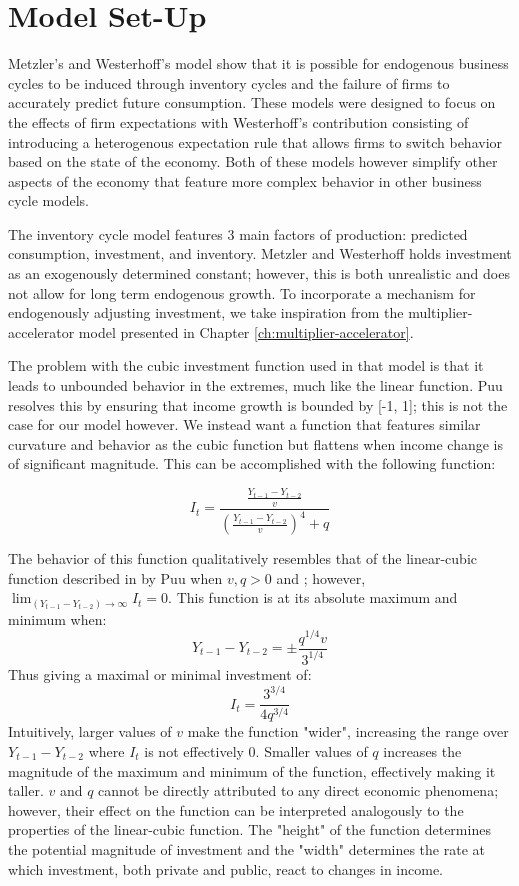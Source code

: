 \section{Model Set-Up}
Metzler's and Westerhoff's model show that it is possible for endogenous business cycles to be induced through inventory cycles and the failure of firms to accurately predict future consumption. These models were designed to focus on the effects of firm expectations with Westerhoff's contribution consisting of introducing a heterogenous expectation rule that allows firms to switch behavior based on the state of the economy. Both of these models however simplify other aspects of the economy that feature more complex behavior in other business cycle models.

The inventory cycle model features 3 main factors of production: predicted consumption, investment, and inventory. Metzler and Westerhoff holds investment as an exogenously determined constant; however, this is both unrealistic and does not allow for long term endogenous growth. To incorporate a mechanism for endogenously adjusting investment, we take inspiration from the multiplier-accelerator model presented in Chapter \ref{ch:multiplier-accelerator}. 

The problem with the cubic investment function used in that model is that it leads to unbounded behavior in the extremes, much like the linear function. Puu resolves this by ensuring that income growth is bounded by [-1, 1]; this is not the case for our model however. We instead want a function that features similar curvature and behavior as the cubic function but flattens when income change is of significant magnitude. This can be accomplished with the following function:

\begin{equation}
    I_t = \frac{\frac{Y_{t-1}-Y_{t-2}}{v}}{(\frac{Y_{t-1}-Y_{t-2}}{v})^4+q}	
\end{equation}

The behavior of this function qualitatively resembles that of the linear-cubic function described in by Puu when $v,q>0$ and ; however, $\lim_{(Y_{t-1}-Y_{t-2})\to\infty}I_t=0$. This function is at its absolute maximum and minimum when:
\begin{equation*}
    Y_{t-1}-Y_{t-2}=\pm\frac{q^{1/4}v}{3^{1/4}}
\end{equation*}
Thus giving a maximal or minimal investment of:
\begin{equation*}
    I_t=\frac{3^{3/4}}{4q^{3/4}}
\end{equation*}
Intuitively, larger values of $v$ make the function "wider", increasing the range over $Y_{t-1}-Y_{t-2}$ where $I_t$ is not effectively 0. Smaller values of $q$ increases the magnitude of the maximum and minimum of the function, effectively making it taller. $v$ and $q$ cannot be directly attributed to any direct economic phenomena; however, their effect on the function can be interpreted analogously to the properties of the linear-cubic function. The "height" of the function determines the potential magnitude of investment and the "width" determines the rate at which investment, both private and public, react to changes in income.

